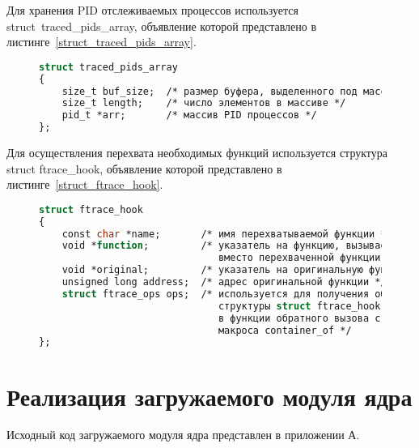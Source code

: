 Для хранения PID отслеживаемых процессов используется struct~traced\_pids\_array, объявление которой представлено в листинге~\ref{struct_traced_pids_array}.
\begin{figure}[H]
	\begin{lstlisting}[label=struct_traced_pids_array,caption=Объявление структуры struct~traced\_pids\_array,language=Caml]
struct traced_pids_array
{
	size_t buf_size;  /* размер буфера, выделенного под массив */
	size_t length;    /* число элементов в массиве */
	pid_t *arr;       /* массив PID процессов */
};
	\end{lstlisting}
\end{figure}

Для осуществления перехвата необходимых функций используется структура struct ftrace\_hook, объявление которой представлено в листинге~\ref{struct_ftrace_hook}.
\begin{figure}[H]
	\begin{lstlisting}[label=struct_ftrace_hook,caption=Объявление структуры struct~ftrace\_hook,language=Caml]
struct ftrace_hook
{
	const char *name;       /* имя перехватываемой функции */
	void *function;         /* указатель на функцию, вызываемую
	                           вместо перехваченной функции */
	void *original;         /* указатель на оригинальную функцию */
	unsigned long address;  /* адрес оригинальной функции */
	struct ftrace_ops ops;  /* используется для получения объекта
	                           структуры struct ftrace_hook
	                           в функции обратного вызова с помощью
	                           макроса container_of */
};
	\end{lstlisting}
\end{figure}

\section{Реализация загружаемого модуля ядра}

Исходный код загружаемого модуля ядра представлен в приложении А.

